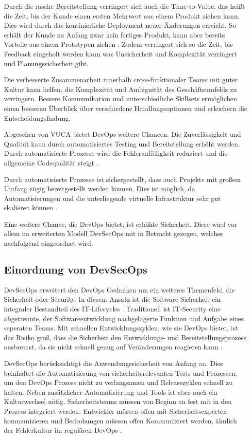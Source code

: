 Durch die rasche Bereitstellung verringert sich auch die Time-to-Value, das heißt die 
Zeit, bis der Kunde einen ersten Mehrwert aus einem Produkt ziehen kann.
Dies wird durch das kontinierliche Deployment neuer Änderungen erreicht. So erhält
der Kunde zu Anfang zwar kein fertiges Produkt, kann aber bereits Vorteile aus einem
Prototypen ziehen \cite{Halstenberg2020}. Zudem verringert sich so die Zeit, bis Feedback eingeholt werden kann
was Unsicherheit und Komplexität verringert und Planungssicherheit gibt.

Die verbesserte Zusammenarbeit innerhalb cross-funktionaler Teams mit guter Kultur
kann helfen, die Komplexität und Ambiguität des Geschäftsumfelds zu verringern.
Bessere Kommunikation und unterschiedliche Skillsets ermöglichen einen besseren Überblick
über verschiedene Handlungsoptionen und erleichern die Entscheidungsfindung.

Abgesehen von VUCA bietet DevOps weitere Chancen.
Die Zuverlässigkeit und Qualität kann durch automatisiertes Testing und Bereitstellung
erhöht werden. Durch automatisierte Prozesse wird die Fehleranfälligkeit
reduziert und die allgemeine Codequalität steigt \cite{AmazonDevOps}.

Durch automatisierte Prozesse ist sichergestellt, dass auch Projekte mit großem 
Umfang zügig bereitgestellt werden können. Dies ist möglich, da Automatisierungen und die 
unterliegende virtuelle Infrastruktur sehr gut skalieren können \cite{AmazonDevOps}.

Eine weitere Chance, die DevOps bietet, ist erhöhte Sicherheit.
Diese wird vor allem im erweiterten Modell DevSecOps mit in Betracht gezogen,
welches nachfolgend eingeordnet wird.

\subsection{Einordnung von DevSecOps}

DevSecOps erweitert den DevOps Gedanken um ein weiteres Themenfeld, die Sicherheit oder
Security. In diesem Ansatz ist die Software Sicherheit ein integraler Bestandteil
des IT-Lifecycles \cite{RedHatDevSecOps}.
Traditionell ist IT-Security eine abgetrennte, der Softwareentwicklung nachgelagerte Funktion
und Aufgabe eines seperaten Teams.
Mit schnellen Entwicklungszyklen, wie sie DevOps bietet, ist das Risiko groß,
dass die Sicherheit den Entwicklungs- und Bereitstellungsprozess ausbremst, da
sie nicht schnell genug auf Veränderungen reagieren kann \cite{RedHatDevSecOps}.

DevSecOps berücksichtigt die Anwendungssicherheit von Anfang an. Dies beinhaltet die
Automatisierung von sicherheitsrelevanten Tests und Prozessen,
um den DevOps Prozess nicht zu verlangsamen und Releasezyklen schnell zu halten.
Neben zusätzlicher Automatisierung und Tools ist aber auch ein Kulturwechsel nötig.
Sicherheitsteams müssen von Beginn an fest mit in den Prozess integriert werden.
Entwickler müssen offen mit Sicherheitsexperten kommunizieren und Bedrohungen müssen
offen Kommuniziert werden, ähnlich der Fehlerkultur im regulären DevOps \cite{RedHatDevSecOps}.